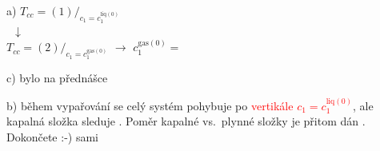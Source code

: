 a) \quad $T_{cc} = (1)\big/_{c_1 = c_1^{\text{liq}(0)}}$ \\
\phantom{a)} \quad\ $\downarrow$ \\
\phantom{a)} \quad $T_{cc} = (2)\big/_{c_1 = c_1^{\text{gas}(0)}}$ \quad $\to$ \quad $c_1^{\text{gas}(0)} =$

c) bylo na přednášce

b) během vypařování se celý systém pohybuje po \textcolor{Red}{vertikále $c_1 = c_1^{\text{liq}(0)}$}, ale kapalná složka
\textcolor{OliveGreen}{sleduje }. Poměr kapalné vs.\ plynné složky je přitom dán . Dokončete :-) sami
